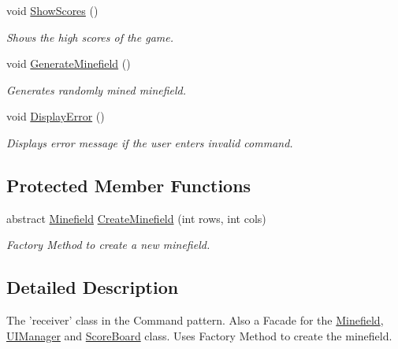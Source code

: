 \begin{DoxyCompactItemize}
void \hyperlink{class_minesweeper_1_1_game_1_1_minesweeper_game_a327c14748c81e511c4156c3e96290668}{Show\+Scores} ()
\begin{DoxyCompactList}\small\item\em Shows the high scores of the game. \end{DoxyCompactList}\item 
void \hyperlink{class_minesweeper_1_1_game_1_1_minesweeper_game_aa0a9944c0b3d78a2a322b1c8ecd2c19a}{Generate\+Minefield} ()
\begin{DoxyCompactList}\small\item\em Generates randomly mined minefield. \end{DoxyCompactList}\item 
void \hyperlink{class_minesweeper_1_1_game_1_1_minesweeper_game_aff1f0ecbb453fcdec86d441a3a56f834}{Display\+Error} ()
\begin{DoxyCompactList}\small\item\em Displays error message if the user enters invalid command. \end{DoxyCompactList}\end{DoxyCompactItemize}
\subsection*{Protected Member Functions}
\begin{DoxyCompactItemize}
\item 
abstract \hyperlink{class_minesweeper_1_1_game_1_1_minefield}{Minefield} \hyperlink{class_minesweeper_1_1_game_1_1_minesweeper_game_a44c9074e398f608490fa956a59c8e366}{Create\+Minefield} (int rows, int cols)
\begin{DoxyCompactList}\small\item\em Factory Method to create a new minefield. \end{DoxyCompactList}\end{DoxyCompactItemize}


\subsection{Detailed Description}
The 'receiver' class in the Command pattern. Also a Facade for the \hyperlink{class_minesweeper_1_1_game_1_1_minefield}{Minefield}, \hyperlink{class_minesweeper_1_1_game_1_1_u_i_manager}{U\+I\+Manager} and \hyperlink{class_minesweeper_1_1_game_1_1_score_board}{Score\+Board} class. Uses Factory Method to create the minefield. 



